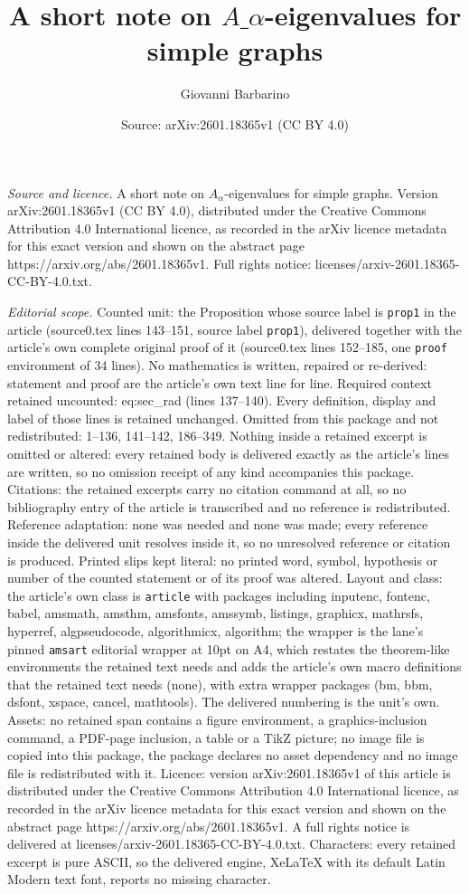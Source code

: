 \documentclass[10pt,a4paper]{amsart}
\title[A short note on $A\_\alpha$-eigenvalues for simple graphs]{A short note on $A\_\alpha$-eigenvalues for simple graphs}
\author{Giovanni Barbarino}
\date{Source: arXiv:2601.18365v1 (CC BY 4.0)}
\begin{document}
\maketitle

\noindent\emph{Source and licence.} A short note on $A_\alpha$-eigenvalues for simple graphs. Version arXiv:2601.18365v1 (CC BY 4.0), distributed under the Creative Commons Attribution 4.0 International licence, as recorded in the arXiv licence metadata for this exact version and shown on the abstract page https://arxiv.org/abs/2601.18365v1. Full rights notice: licenses/arxiv-2601.18365-CC-BY-4.0.txt.\par\smallskip

\noindent\textit{Editorial scope.} Counted unit: the Proposition whose source label is \texttt{prop1} in the article (source0.tex lines 143--151, source label \texttt{prop1}), delivered together with the article's own complete original proof of it (source0.tex lines 152--185, one \texttt{proof} environment of 34 lines). No mathematics is written, repaired or re-derived: statement and proof are the article's own text line for line. Required context retained uncounted: eq:sec\_rad (lines 137--140). Every definition, display and label of those lines is retained unchanged. Omitted from this package and not redistributed: 1--136, 141--142, 186--349. Nothing inside a retained excerpt is omitted or altered: every retained body is delivered exactly as the article's lines are written, so no omission receipt of any kind accompanies this package. Citations: the retained excerpts carry no citation command at all, so no bibliography entry of the article is transcribed and no reference is redistributed. Reference adaptation: none was needed and none was made; every reference inside the delivered unit resolves inside it, so no unresolved reference or citation is produced. Printed slips kept literal: no printed word, symbol, hypothesis or number of the counted statement or of its proof was altered. Layout and class: the article's own class is \texttt{article} with packages including inputenc, fontenc, babel, amsmath, amsthm, amsfonts, amssymb, listings, graphicx, mathrsfs, hyperref, algpseudocode, algorithmicx, algorithm; the wrapper is the lane's pinned \texttt{amsart} editorial wrapper at 10pt on A4, which restates the theorem-like environments the retained text needs and adds the article's own macro definitions that the retained text needs (none), with extra wrapper packages (bm, bbm, dsfont, xspace, cancel, mathtools). The delivered numbering is the unit's own. Assets: no retained span contains a figure environment, a graphics-inclusion command, a PDF-page inclusion, a table or a TikZ picture; no image file is copied into this package, the package declares no asset dependency and no image file is redistributed with it. Licence: version arXiv:2601.18365v1 of this article is distributed under the Creative Commons Attribution 4.0 International licence, as recorded in the arXiv licence metadata for this exact version and shown on the abstract page https://arxiv.org/abs/2601.18365v1. A full rights notice is delivered at licenses/arxiv-2601.18365-CC-BY-4.0.txt. Characters: every retained excerpt is pure ASCII, so the delivered engine, XeLaTeX with its default Latin Modern text font, reports no missing character.
\end{document}
